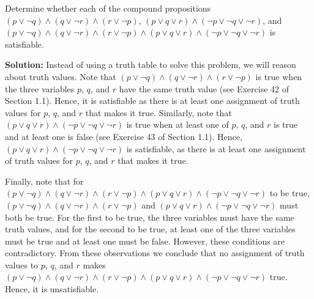 \documentclass{Axon}
\begin{document}
\begin{example}\label{Example: 9}
    Determine whether each of the compound propositions \((p \lor \lnot q) \land (q \lor \lnot r) \land (r \lor \lnot p)\), \((p \lor q \lor r) \land (\lnot p \lor \lnot q \lor \lnot r)\), and \((p \lor \lnot q) \land (q \lor \lnot r) \land (r \lor \lnot p) \land (p \lor q \lor r) \land (\lnot p \lor \lnot q \lor \lnot r)\) is satisfiable.

    \noindent
    \textbf{Solution:}
    Instead of using a truth table to solve this problem, we will reason about truth values. Note that \((p \lor \lnot q) \land (q \lor \lnot r) \land (r \lor \lnot p)\) is true when the three variables \(p\), \(q\), and \(r\) have the same truth value (see Exercise 42 of Section 1.1). Hence, it is satisfiable as there is at least one assignment of truth values for \(p\), \(q\), and \(r\) that makes it true. Similarly, note that \((p \lor q \lor r) \land (\lnot p \lor \lnot q \lor \lnot r)\) is true when at least one of \(p\), \(q\), and \(r\) is true and at least one is false (see Exercise 43 of Section 1.1). Hence, \((p \lor q \lor r) \land (\lnot p \lor \lnot q \lor \lnot r)\) is satisfiable, as there is at least one assignment of truth values for \(p\), \(q\), and \(r\) that makes it true.

    Finally, note that for \((p \lor \lnot q) \land (q \lor \lnot r) \land (r \lor \lnot p) \land (p \lor q \lor r) \land (\lnot p \lor \lnot q \lor \lnot r)\) to be true, \((p \lor \lnot q) \land (q \lor \lnot r) \land (r \lor \lnot p)\) and \((p \lor q \lor r) \land (\lnot p \lor \lnot q \lor \lnot r)\) must both be true. For the first to be true, the three variables must have the same truth values, and for the second to be true, at least one of the three variables must be true and at least one must be false. However, these conditions are contradictory. From these observations we conclude that no assignment of truth values to \(p\), \(q\), and \(r\) makes \((p \lor \lnot q) \land (q \lor \lnot r) \land (r \lor \lnot p) \land (p \lor q \lor r) \land (\lnot p \lor \lnot q \lor \lnot r)\) true. Hence, it is unsatisfiable.
\end{example}

\printbibliography
\end{document}
